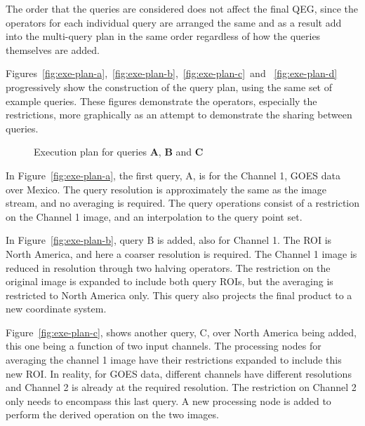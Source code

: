 \documentclass{ucdthesis}       %
\newcommand{\qry}[1]{{\bf #1}}
\begin{document}
The order that the queries are considered does not affect the final
\ac{QEG}, since the operators for each individual query are arranged
the same and as a result add into the multi-query plan in the same
order regardless of how the queries themselves are added.

Figures~\ref{fig:exe-plan-a},~\ref{fig:exe-plan-b},~\ref{fig:exe-plan-c}~and
~\ref{fig:exe-plan-d} progressively show the construction of the query
plan, using the same set of example queries.  These figures
demonstrate the operators, especially the restrictions, more
graphically as an attempt to demonstrate the sharing between queries.

\begin{figure}[htb]
  \centering
  \subfigure[\qry{A}]{
    \label{fig:exe-plan-a}
    \scalebox{0.8}{}
  }\hfill
  \subfigure[\qry{A},\qry{B}]{
    \label{fig:exe-plan-b}
    \scalebox{0.8}{}
  }\hfill
  \subfigure[\qry{A},\qry{B},\qry{C}]{
  \label{fig:exe-plan-c}
    \scalebox{0.8}{}
  }
  \caption{Execution plan for queries \qry{A}, \qry{B} and \qry{C}}
  \label{fig:exe-plan-abc}
\end{figure}

In Figure~\ref{fig:exe-plan-a}, the first query, A, is for the Channel
1, \ac{GOES} data over Mexico.  The query resolution is approximately
the same as the image stream, and no averaging is required.  The query
operations consist of a restriction on the Channel 1 image, and an
interpolation to the query point set.  

In Figure~\ref{fig:exe-plan-b}, query B is added, also for Channel 1.
The \ac{ROI} is North America, and here a coarser resolution
is required.  The Channel 1 image is reduced in resolution through two
halving operators.  The restriction on the original image is
expanded to include both query \acp{ROI}, but the averaging is
restricted to North America only.  This query also projects the final
product to a new coordinate system.

Figure~\ref{fig:exe-plan-c}, shows another query, C, over North
America being added, this one being a function of two input channels.
The processing nodes for averaging the channel 1 image have their
restrictions expanded to include this new \ac{ROI}.  In reality, for
\ac{GOES} data, different channels have different resolutions and
Channel 2 is already at the required resolution.  The restriction on
Channel 2 only needs to encompass this last query.  A new processing
node is added to perform the derived operation on the two images.
\end{document}
